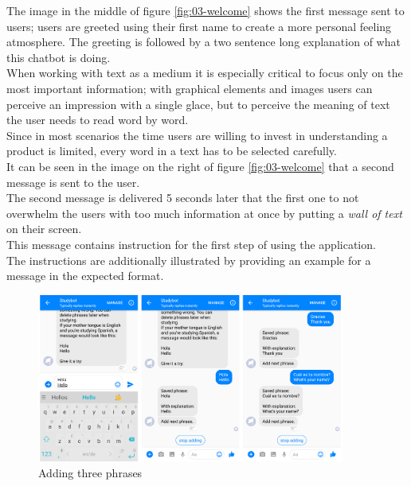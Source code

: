 The image in the middle of figure \ref{fig:03-welcome} shows the first message sent to users;
users are greeted using their first name to create a more personal feeling atmosphere.
The greeting is followed by a two sentence long explanation of what this chatbot is doing.
\\
When working with text as a medium it is especially critical to focus only on the most important information;
with graphical elements and images users can perceive an impression with a single glace,
but to perceive the meaning of text the user needs to read word by word.
\\
Since in most scenarios the time users are willing to invest in understanding a product is limited,
every word in a text has to be selected carefully.
\\

It can be seen in the image on the right of figure \ref{fig:03-welcome} that a second message is sent to the user.
\\
The second message is delivered 5 seconds later that the first one to not overwhelm the users with too much information at once
by putting a \emph{wall of text} on their screen.
\\
This message contains instruction for the first step of using the application.
\\
The instructions are additionally illustrated by providing an example for a message in the expected format.
\\

\begin{figure}[h]
  \centering
  \includegraphics[width=0.9\textwidth]{images/interface/04-add.png}
	\caption{Adding three phrases}
	\label{fig:04-add}
\end{figure}

